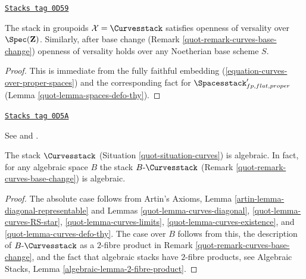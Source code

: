 \begin{lemma}
\label{quot-lemma-curves-defo-thy}
\href{https://stacks.math.columbia.edu/tag/0D59}{\texttt{Stacks tag 0D59}}

The stack in groupoids $\mathcal{X} = \Curvesstack$
satisfies openness of versality over $\Spec(\mathbf{Z})$.
Similarly, after base change (Remark \ref{quot-remark-curves-base-change})
openness of versality holds over any Noetherian base scheme $S$.
\end{lemma}

\begin{proof}

This is immediate from the fully faithful embedding
(\ref{equation-curves-over-proper-spaces}) and
the corresponding fact for $\Spacesstack'_{fp, flat, proper}$
(Lemma \ref{quot-lemma-spaces-defo-thy}).
\end{proof}

\begin{theorem}

\label{quot-theorem-curves-algebraic}
\href{https://stacks.math.columbia.edu/tag/0D5A}{\texttt{Stacks tag 0D5A}}

\begin{reference}
See \cite[Proposition 3.3, page 8]{dJHS} and
\cite[Appendix B by Jack Hall, Theorem B.1]{Smyth}.
\end{reference}
The stack $\Curvesstack$ (Situation \ref{quot-situation-curves})
is algebraic. In fact, for any algebraic space $B$ the stack
$B\text{-}\Curvesstack$ (Remark \ref{quot-remark-curves-base-change})
is algebraic.
\end{theorem}

\begin{proof}

The absolute case follows from
Artin's Axioms, Lemma \ref{artin-lemma-diagonal-representable}
and Lemmas \ref{quot-lemma-curves-diagonal},
\ref{quot-lemma-curves-RS-star},
\ref{quot-lemma-curves-limits},
\ref{quot-lemma-curves-existence}, and
\ref{quot-lemma-curves-defo-thy}.
The case over $B$ follows from this, the description of
$B\text{-}\Curvesstack$ as a $2$-fibre product in
Remark \ref{quot-remark-curves-base-change}, and the fact
that algebraic stacks have $2$-fibre products, see
Algebraic Stacks, Lemma \ref{algebraic-lemma-2-fibre-product}.
\end{proof}

